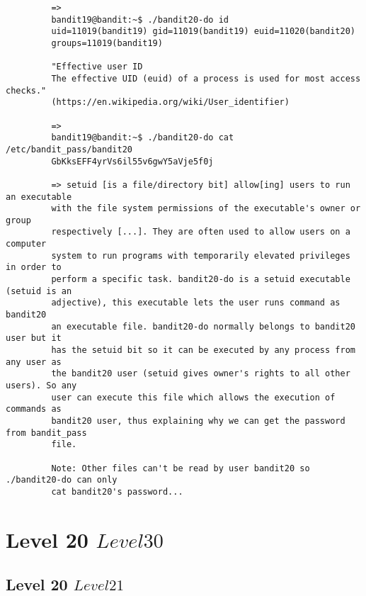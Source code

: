 \documentclass[a4paper]{report}
\begin{document}
\begin{verbatim}
		 =>
		 bandit19@bandit:~$ ./bandit20-do id
		 uid=11019(bandit19) gid=11019(bandit19) euid=11020(bandit20)
		 groups=11019(bandit19)
		 
		 "Effective user ID
		 The effective UID (euid) of a process is used for most access checks."
		 (https://en.wikipedia.org/wiki/User_identifier)

		 =>
		 bandit19@bandit:~$ ./bandit20-do cat /etc/bandit_pass/bandit20
		 GbKksEFF4yrVs6il55v6gwY5aVje5f0j

		 => setuid [is a file/directory bit] allow[ing] users to run an executable 
		 with the file system permissions of the executable's owner or group 
		 respectively [...]. They are often used to allow users on a computer 
		 system to run programs with temporarily elevated privileges in order to 
		 perform a specific task. bandit20-do is a setuid executable (setuid is an 
		 adjective), this executable lets the user runs command as bandit20
		 an executable file. bandit20-do normally belongs to bandit20 user but it 
		 has the setuid bit so it can be executed by any process from any user as 
		 the bandit20 user (setuid gives owner's rights to all other users). So any 
		 user can execute this file which allows the execution of commands as 
		 bandit20 user, thus explaining why we can get the password from bandit_pass 
		 file.

		 Note: Other files can't be read by user bandit20 so ./bandit20-do can only
		 cat bandit20's password...
\end{verbatim}



\chapter{Level 20 \rightarrow $ Level 30 $}

\section{Level 20 \rightarrow $ Level 21 $}
\end{document}
